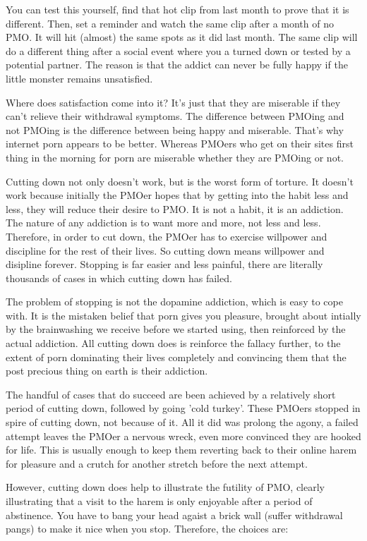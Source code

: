 You can test this yourself, find that hot clip from last month to prove that it is different. Then, set a reminder and watch the same clip after a month of no PMO. It will hit (almost) the same spots as it did last month. The same clip will do a different thing after a social event where you a turned down or tested by a potential partner. The reason is that the addict can never be fully happy if the little monster remains unsatisfied.

Where does satisfaction come into it? It's just that they are miserable if they can't relieve their withdrawal symptoms. The difference between PMOing and not PMOing is the difference between being happy and miserable. That's why internet porn appears to be better. Whereas PMOers who get on their sites first thing in the morning for porn are miserable whether they are PMOing or not.

Cutting down not only doesn't work, but is the worst form of torture. It doesn't work because initially the PMOer hopes that by getting into the habit less and less, they will reduce their desire to PMO. It is not a habit, it is an addiction. The nature of any addiction is to want more and more, not less and less. Therefore, in order to cut down, the PMOer has to exercise willpower and discipline for the rest of their lives. So cutting down means willpower and disipline forever. Stopping is far easier and less painful, there are literally thousands of cases in which cutting down has failed.

The problem of stopping is not the dopamine addiction, which is easy to cope with. It is the mistaken belief that porn gives you pleasure, brought about intially by the brainwashing we receive before we started using, then reinforced by the actual addiction. All cutting down does is reinforce the fallacy further, to the extent of porn dominating their lives completely and convincing them that the post precious thing on earth is their addiction.

The handful of cases that do succeed are been achieved by a relatively short period of cutting down, followed by going 'cold turkey'. These PMOers stopped in spire of cutting down, not because of it. All it did was prolong the agony, a failed attempt leaves the PMOer a nervous wreck, even more convinced they are hooked for life. This is usually enough to keep them reverting back to their online harem for pleasure and a crutch for another stretch before the next attempt.

However, cutting down does help to illustrate the futility of PMO, clearly illustrating that a visit to the harem is only enjoyable after a period of abstinence. You have to bang your head agaist a brick wall (suffer withdrawal pangs) to make it nice when you stop. Therefore, the choices are:

